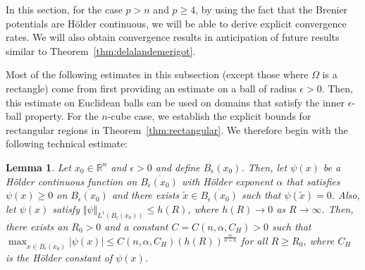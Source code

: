\documentclass{amsart}
\theoremstyle{lemma}
\newtheorem{lemma}[theorem]{Lemma}
\theoremstyle{remark}
\begin{document}
In this section, for the case $p>n$ and $p \geq 4$, by using the fact that the Brenier potentials are H\"{o}lder continuous, we will be able to derive explicit convergence rates. We will also obtain convergence results in anticipation of future results similar to Theorem~\ref{thm:delalandemerigot}.

Most of the following estimates in this subsection (except those where $\Omega$ is a rectangle) come from first providing an estimate on a ball of radius $\epsilon>0$. Then, this estimate on Euclidean balls can be used on domains that satisfy the inner $\epsilon$-ball property. For the $n$-cube case, we establish the explicit bounds for rectangular regions in Theorem~\ref{thm:rectangular}. We therefore begin with the following technical estimate:

\begin{lemma}\label{lemma:estimate1}
Let $x_0 \in \mathbb{R}^n$ and $\epsilon>0$ and define $B_{\epsilon}(x_0)$. Then, let $\psi(x)$ be a H\"{o}lder continuous function on $\overline{B_{\epsilon}(x_0)}$ with H\"{o}lder exponent $\alpha$ that satisfies $\psi(x) \geq 0$ on $\overline{B_{\epsilon}(x_0)}$ and there exists $\tilde{x} \in \overline{B_{\epsilon}(x_0)}$ such that $\psi(\tilde{x}) = 0$. Also, let $\psi(x)$ satisfy $\Vert \psi \Vert_{L^1(B_{\epsilon}(x_0))} \leq h(R)$, where $h(R) \rightarrow 0$ as $R \rightarrow \infty$. Then, there exists an $R_0>0$ and a constant $C = C(n, \alpha, C_{H})>0$ such that $\max_{x \in \overline{B_{\epsilon}(x_0)}} \vert \psi(x) \vert \leq C(n, \alpha, C_{H}) (h(R))^{\frac{\alpha}{\alpha + n}}$ for all $R \geq R_0$, where $C_{H}$ is the H\"{o}lder constant of $\psi(x)$.
\end{lemma}
\end{document}
